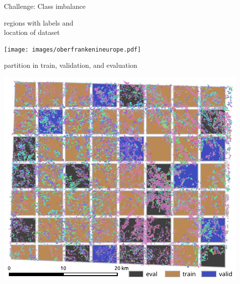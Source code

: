 \documentclass[a0]{tumposter}
\begin{document}
\begin{minipage}[t]{.65\textwidth}
\begin{minipage}[t]{.66\textwidth}
\begin{minipage}{.49\textwidth}
		\vspace{1em}
	
		\tiny Challenge: Class imbalance \par
		
	\end{minipage}
	\begin{minipage}{.33\textwidth}
%		
		\tiny {\color{tumblue}regions with labels} and \\ {\color{tumorange} location of dataset} \par
		\texttt{[image: images/oberfrankenineurope.pdf]}
		 
		 \tiny partition in {\color{traincolor} train}, {\color{validcolor} validation}, and {\color{evalcolor} evaluation} \par
		\includegraphics[width=.9\textwidth]{images/holl.pdf}
	\end{minipage}
	
	\end{minipage}

\end{minipage}
\hfill
\end{document}
